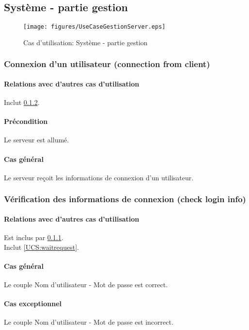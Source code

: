 \subsection{Système - partie gestion}
\begin{figure}[h!]
    \centering
    \texttt{[image: figures/UseCaseGestionServer.eps]}
    \caption{\label{fig:UCS:system} Cas d'utilisation: Système - partie gestion}
\end{figure}

\subsubsection{Connexion d'un utilisateur (connection from client)}
	\label{UCS:connection}
	\paragraph{Relations avec d'autres cas d'utilisation} Inclut \ref{UCS:verification}.
    \paragraph{Précondition} Le \gls{serveur} est allumé.
    \paragraph{Cas général} Le serveur reçoit les informations de connexion d'un utilisateur.


\subsubsection{Vérification des informations de connexion (check login info)}
	\label{UCS:verification}
	\paragraph{Relations avec d'autres cas d'utilisation} Est inclus par \ref{UCS:connection}.\\
	Inclut \ref{UCS:waitrequest}.
    \paragraph{Cas général} Le couple Nom d'utilisateur - Mot de passe est correct.
    \paragraph{Cas exceptionnel} Le couple Nom d'utilisateur - Mot de passe est incorrect.
